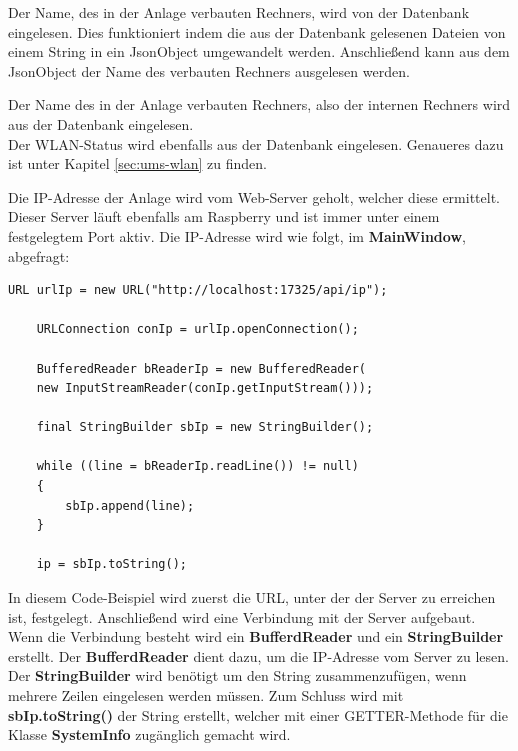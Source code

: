 \vspace{10pt}

Der Name, des in der Anlage verbauten Rechners, wird von der Datenbank eingelesen. Dies funktioniert indem die aus der Datenbank gelesenen Dateien von einem String in ein JsonObject umgewandelt werden. Anschließend kann aus dem JsonObject der Name des verbauten Rechners ausgelesen werden.

\vspace{50pt}

Der Name des in der Anlage verbauten Rechners, also der internen Rechners wird aus der Datenbank eingelesen. 
\\ Der WLAN-Status wird ebenfalls aus der Datenbank eingelesen. Genaueres dazu ist unter Kapitel \ref{sec:ums-wlan} zu finden.

\vspace{10pt}

Die IP-Adresse der Anlage wird vom Web-Server geholt, welcher diese ermittelt. Dieser Server läuft ebenfalls am Raspberry und ist immer unter einem festgelegtem Port aktiv. Die \ac{IP}-Adresse wird wie folgt, im \textbf{MainWindow}, abgefragt:
\begin{lstlisting}[style=JavaStyle, caption=Abfragen der \ac{IP}-Adresse]
	URL urlIp = new URL("http://localhost:17325/api/ip");
	
	URLConnection conIp = urlIp.openConnection();
	
	BufferedReader bReaderIp = new BufferedReader(
	new InputStreamReader(conIp.getInputStream()));    
	
	final StringBuilder sbIp = new StringBuilder();
	
	while ((line = bReaderIp.readLine()) != null)
	{
		sbIp.append(line);
	}
            
	ip = sbIp.toString();    
\end{lstlisting}
In diesem Code-Beispiel wird zuerst die \ac{URL}, unter der der Server zu erreichen ist, festgelegt. Anschließend wird eine Verbindung mit der Server aufgebaut. Wenn die Verbindung besteht wird ein \textbf{BufferdReader} und ein \textbf{StringBuilder} erstellt. Der \textbf{BufferdReader} dient dazu, um die \ac{IP}-Adresse vom Server zu lesen. Der \textbf{StringBuilder} wird benötigt um den String zusammenzufügen, wenn mehrere Zeilen eingelesen werden müssen. Zum Schluss wird mit \textbf{sbIp.toString()} der String erstellt, welcher mit einer GETTER-Methode für die Klasse \textbf{SystemInfo} zugänglich gemacht wird.

\vspace{10pt}


